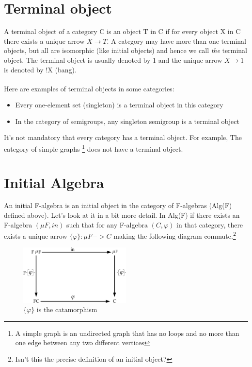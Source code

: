 \documentclass{article}
\begin{document}
\section{Terminal object}

A terminal object of a category C is an object T in C if for every object X in C there exists a unique arrow $X \rightarrow T$. A category may have more than one terminal objects, but all are isomorphic (like initial objects) and hence we call \textit{the} terminal object. The terminal object is usually denoted by 1 and the unique arrow $X \rightarrow 1$ is denoted by !X (bang). \\ \\
Here are examples of terminal objects in some categories:

\begin{itemize}
\item{Every one-element set (singleton) is a terminal object in this category}
\item{In the category of semigroups, any singleton semigroup is a terminal object}
\end{itemize}
It's not mandatory that every category has a terminal object. For example, The category of simple graphs \footnote{A simple graph is an undirected graph that has no loops and no more than one edge between any two different vertices} does not have a terminal object.

\section{Initial Algebra}

An initial F-algebra is an initial object in the category of F-algebras (Alg(F) defined above). Let's look at it in a bit more detail. In Alg(F) if there exists an F-algebra $\left( \mu F, in\right) $ such that for any F-algebra $\left( C, \varphi\right) $ in that category, there exists a unique arrow $\{\varphi\}: \mu F -> C$ making the following diagram commute.\footnote{Isn't this the precise definition of an initial object?} \\


\begin{figure}[htb]
\begin{center}
\includegraphics[width=0.5\textwidth]{figures/alg4}
\caption{$\{ \varphi \}$ is the catamorphism}
\end{center}
\end{figure}
\end{document}
